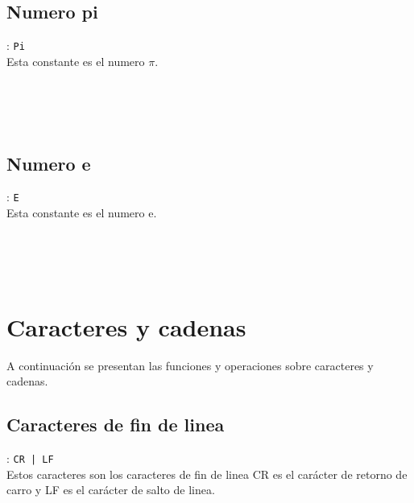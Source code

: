       \subsection*{Numero pi}: \texttt{Pi}\\
      Esta constante es el numero $\pi$.
      
      \begin{fxcode}
         \\
         \\
         \\
      \end{fxcode}
      
      \subsection*{Numero e}: \texttt{E}\\
      Esta constante es el numero e.
      
      \begin{fxcode}
         \\
         \\
         \\
      \end{fxcode}
      
   \section{Caracteres y cadenas}
      A continuación se presentan las funciones y operaciones sobre caracteres y cadenas.
      
      \subsection*{Caracteres de fin de linea}: \texttt{CR | LF}\\
      Estos caracteres son los caracteres de fin de linea
      CR es el carácter de retorno de carro y LF es el carácter de salto de linea.
      
      \begin{fxcode}
         \\
         \\
         \\
      \end{fxcode}
      
